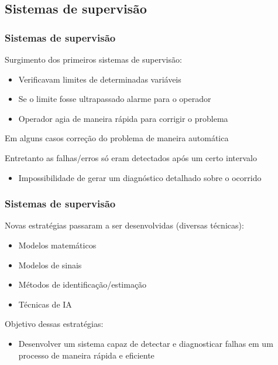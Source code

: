 \documentclass{beamer}
\begin{document}
\subsection{Sistemas de supervisão}
\begin{frame}
    \frametitle{Sistemas de supervisão}

    Surgimento dos primeiros sistemas de supervisão:

\begin{itemize}
    \item Verificavam limites de determinadas variáveis
    \item Se o limite fosse ultrapassado \implica alarme para o operador
    \item Operador agia de maneira rápida para corrigir o problema
\end{itemize}

    Em alguns casos \implica correção do problema de maneira automática

    \vspace{0.25cm}

    Entretanto as falhas/erros só eram detectados após um certo intervalo

\begin{itemize}
    \item Impossibilidade de gerar um diagnóstico detalhado sobre o ocorrido
\end{itemize}

\end{frame}

\begin{frame}
    \frametitle{Sistemas de supervisão}

    Novas estratégias passaram a ser desenvolvidas (diversas técnicas):

\begin{itemize}
    \item Modelos matemáticos
    \item Modelos de sinais
    \item Métodos de identificação/estimação
    \item \alert{Técnicas de IA}
\end{itemize}

    Objetivo dessas estratégias:

\begin{itemize}
    \item Desenvolver um sistema capaz de detectar e diagnosticar
          falhas em um processo de maneira rápida e eficiente
\end{itemize}

\end{frame}
\end{document}
